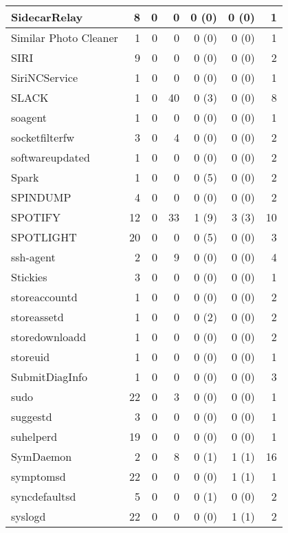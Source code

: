 \begin{adjustwidth}{-2in}{}
\begin{scriptsize}
\begin{longtable}[l]{ l | r | r | r | r | r | r }
    SidecarRelay & 8 &  0 &  0 &  0 (0) &  0 (0) &  1 \\ \hline
    Similar Photo Cleaner &  1 &  0 &  0 &  0 (0) &  0 (0) &  1 \\ \hline
    SIRI & 9 &  0 &  0 &  0 (0) &  0 (0) &  2 \\ \hline
    SiriNCService &  1 &  0 &  0 &  0 (0) &  0 (0) &  1 \\ \hline
    SLACK &  1 &  0 & 40 &  0 (3) &  0 (0) &  8 \\ \hline
    soagent &  1 &  0 &  0 &  0 (0) &  0 (0) &  1 \\ \hline
    socketfilterfw & 3 &  0 &  4 &  0 (0) &  0 (0) &  2 \\ \hline
    softwareupdated &  1 &  0 &  0 &  0 (0) &  0 (0) &  2 \\ \hline
    Spark &  1 &  0 &  0 &  0 (5) &  0 (0) &  2 \\ \hline
    SPINDUMP & 4 &  0 &  0 &  0 (0) &  0 (0) &  2 \\ \hline
    SPOTIFY & 12 &  0 & 33 &  1 (9) &  3 (3) & 10 \\ \hline
    SPOTLIGHT & 20 &  0 &  0 &  0 (5) &  0 (0) &  3 \\ \hline
    ssh-agent &  2 &  0 &  9 &  0 (0) &  0 (0) &  4 \\ \hline
    Stickies & 3 &  0 &  0 &  0 (0) &  0 (0) &  1 \\ \hline
    storeaccountd &  1 &  0 &  0 &  0 (0) &  0 (0) &  2 \\ \hline
    storeassetd &  1 &  0 &  0 &  0 (2) &  0 (0) &  2 \\ \hline
    storedownloadd & 1 &  0 &  0 &  0 (0) &  0 (0) &  2 \\ \hline
    storeuid & 1 &  0 &  0 &  0 (0) &  0 (0) &  1 \\ \hline
    SubmitDiagInfo & 1 &  0 &  0 &  0 (0) &  0 (0) &  3 \\ \hline
    sudo &  22 &  0 &  3 &  0 (0) &  0 (0) &  1 \\ \hline
    suggestd & 3 &  0 &  0 &  0 (0) &  0 (0) &  1 \\ \hline
    suhelperd & 19 &  0 &  0 &  0 (0) &  0 (0) &  1 \\ \hline
    SymDaemon &  2 &  0 &  8 &  0 (1) &  1 (1) & 16 \\ \hline
    symptomsd & 22 &  0 &  0 &  0 (0) &  1 (1) &  1 \\ \hline
    syncdefaultsd &  5 &  0 &  0 &  0 (1) &  0 (0) &  2 \\ \hline
    syslogd & 22 &  0 &  0 &  0 (0) &  1 (1) &  2 \\ \hline

\end{longtable}
\end{scriptsize}
\end{adjustwidth}

